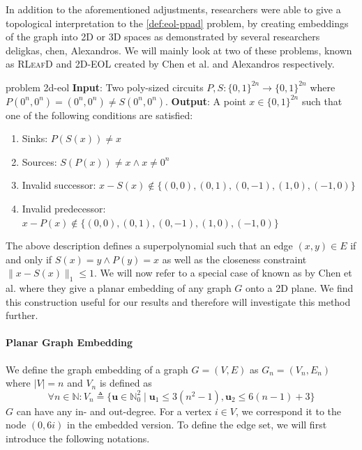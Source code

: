In addition to the aforementioned adjustments, researchers were able to give a topological interpretation
to the  \ref{def:eol-ppad} problem, by creating embeddings of the graph
into 2D or 3D spaces as demonstrated by several researchers {deligkas, chen, Alexandros}.
We will mainly look at two of these problems, known as \textsc{RLeafD} and \textsc{2D-EOL}
created by Chen et al. and Alexandros respectively.

\begin{definitionbox}{ problem {}}{2d-eol}
    \label{2d-eol}
    \textbf{Input}: Two poly-sized circuits $P,S: \{0,1\}^{2n} \to \{0,1\}^{2n}$ where $P(0^{n}, 0^{n}) = (0^{n},0^{n}) \neq S(0^{n}, 0^{n})$.
    \textbf{Output}: A point $x \in \{0,1\}^{2n}$ such that one of the following conditions are satisfied:
    \begin{enumerate}
        \item Sinks: $P(S(x)) \neq x$
        \item Sources: $S(P(x)) \neq  x \wedge x \neq 0^n$
        \item Invalid successor: $x - S(x) \not\in \{(0,0), (0,1), (0,-1), (1,0), (-1,0)\}$
        \item Invalid predecessor: $x - P(x) \not\in \{(0,0), (0,1), (0,-1), (1,0), (-1,0)\}$
    \end{enumerate}
\end{definitionbox}

The above description defines a superpolynomial such that an edge $(x,y) \in E$
if and only if $S(x) = y \wedge P(y) = x$ as well as the closeness constraint $\|x-S(x)\|_1 \leq 1$.
We will now refer to a special case of   known as  by Chen et al. where
they give a planar embedding of any graph $G$ onto a 2D plane. We find this construction useful for our results
and therefore will investigate this method further.

\paragraph{Planar Graph Embedding}
We define the graph embedding of a graph $G = (V,E)$ as $G_n = (V_n, E_n)$ where $|V| = n$ and $V_n$ is defined as
\[
    \forall n \in \mathbb{N}:  V_n \triangleq \Big\{\mathbf{u} \in \mathbb{N}_0^2\mid \mathbf{u}_1 \leq 3(n^2 - 1) , \mathbf{u}_2 \leq 6(n - 1) + 3 \Big\}
\]
$G$ can have any in- and out-degree.
For a vertex $i \in V$, we correspond it to the node $(0, 6i)$ in the embedded version.
To define the edge set, we will first introduce the following notations.

